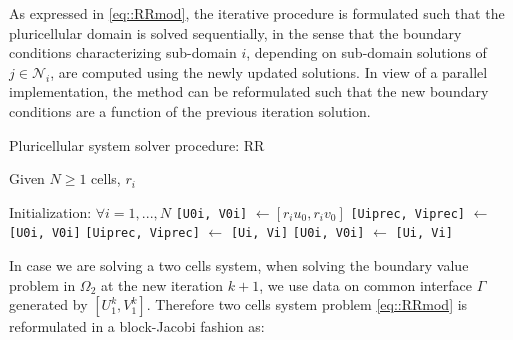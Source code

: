 As expressed in \eqref{eq::RRmod}, the iterative procedure is formulated such that the pluricellular domain is solved sequentially, in the sense that the boundary conditions characterizing sub-domain $i$, depending on sub-domain solutions of $j \in \mathcal{N}_i$, are computed using the newly updated solutions. In view of a parallel implementation, the method can be reformulated such that the new boundary conditions are a function of the previous iteration solution.

\begin{algorithm}[t]
    \caption{Pluricellular system solver procedure: RR}
    \label{alg:RRmod}
    Given $N \geq 1$ cells, $r_i$
    \begin{algorithmic}[1]
    \STATE Initialization: $\forall i = 1, ..., N$
    \STATE \verb|[U0i, V0i]| $\gets [r_i u_0, r_i v_0]$
    \STATE \verb|[Uiprec, Viprec]| $\gets$  \verb|[U0i, V0i]|
    \STATE \verb|[Uiprec, Viprec]| $\gets$  \verb|[Ui, Vi]|
    \ENDFOR
    \STATE \verb|[U0i, V0i]| $\gets$  \verb|[Ui, Vi]|
    \ENDWHILE
    \end{algorithmic}
\end{algorithm}

In case we are solving a two cells system, when solving the boundary value problem in $\Omega_2$ at the new iteration $k+1$, we use data on common interface $\Gamma$ generated by $[U_1^k, V_1^k]$. Therefore two cells system problem \eqref{eq::RRmod} is reformulated in a block-Jacobi fashion as:


